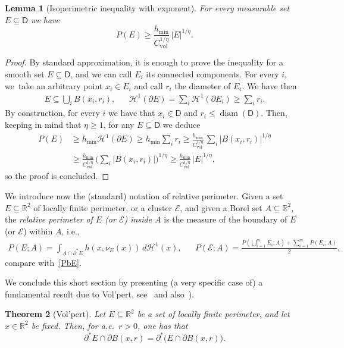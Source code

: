 \documentclass[11pt]{article}
\newcommand{\ie}{i.e.,\xspace}
\numberwithin{equation}{section}
\DeclareMathOperator{\diam}{diam}
\newcommand\R{\mathbb{R}}
\newcommand\Cgr{C_\mathrm{vol}}
\newcommand\E{\mathcal{E}}
\renewcommand\H{\mathcal{H}}
\theoremstyle{plain}
\newtheorem{thm}{Theorem}[section]
\newtheorem{lem}[thm]{Lemma}
\theoremstyle{definition}
\begin{document}
\begin{lem}[Isoperimetric inequality with exponent]\label{disgusting}
For every measurable set $E\subseteq \mathsf{D}$ we have
\[
P(E) \geq \frac{h_{\min}}{\Cgr^{1/\eta}}\, |E|^{1/\eta}.
\]
\end{lem}
\begin{proof}
By standard approximation, it is enough to prove the inequality for a smooth set $E\subseteq \mathsf{D}$, and we can call $E_i$ its connected components. For every $i$, we~take an arbitrary point $x_i\in E_i$ and call $r_i$ the diameter of $E_i$. We have then
\begin{align*}
E\subseteq \bigcup_i B(x_i,r_i), && \H^1(\partial E)=\sum_i \H^1(\partial E_i) \geq \sum_i r_i.
\end{align*}
By construction, for every $i$ we have that $x_i\in \mathsf{D}$ and $r_i\leq \diam(\mathsf{D})$. Then, keeping in mind that $\eta\geq 1$, for any $E\subseteq \mathsf{D}$ we deduce
\[\begin{split}
P(E)&\geq h_{\min} \H^1(\partial E)
\geq h_{\min} \sum\nolimits_i r_i
\geq \frac{h_{\min}}{\Cgr^{1/\eta}}\, \sum\nolimits_i |B(x_i,r_i)|^{1/\eta}\\
&\geq \frac{h_{\min}}{\Cgr^{1/\eta}}\, \Big(\sum\nolimits_i |B(x_i,r_i)|\Big)^{1/\eta}
\geq \frac{h_{\min}}{\Cgr^{1/\eta}}\, |E|^{1/\eta},
\end{split}\]
so the proof is concluded.
\end{proof}

We introduce now the (standard) notation of relative perimeter. Given a set $E\subseteq\R^2$ of locally finite perimeter, or a cluster $\E$, and given a Borel set $A\subseteq \R^2$, the \emph{relative perimeter of $E$ (or $\E$) inside $A$} is the measure of the boundary of $E$ (or $\E$) within $A$, \ie
\begin{align*}
P(E;A) = \int_{A\cap\partial^* E} h(x,\nu_E(x))\, d\H^1(x), &&
P(\E;A) = \frac{P(\bigcup_{i=1}^m E_i;A) + \sum_{i=1}^m P(E_i;A) }2 ,
\end{align*}
compare with~\eqref{PbE}.

We conclude this short section by presenting (a very specific case of) a fundamental result due to Vol'pert, see~\cite{Volpert} and also~\cite[Th.\,3.108]{AFP}).
\begin{thm}[Vol'pert]\label{volpert}
Let $E\subseteq\R^2$ be a set of locally finite perimeter, and let $x\in\R^2$ be fixed. Then, for a.e.\ $r>0$, one has that
\[
\partial^* E \cap \partial B(x,r) = \partial^* \big( E \cap \partial B(x,r)\big).
\]
\end{thm}
\end{document}
